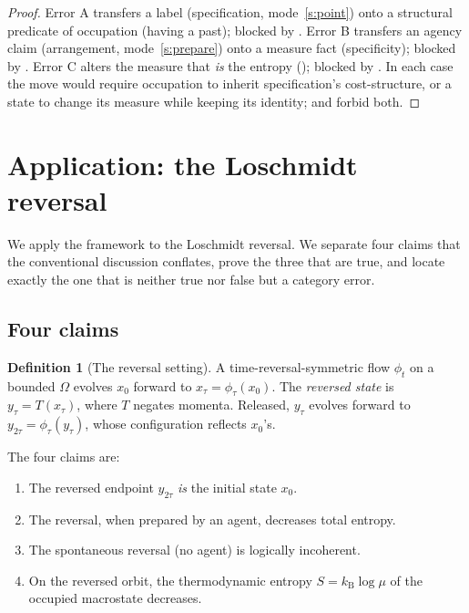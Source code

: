 \documentclass[11pt,a4paper]{article}
\theoremstyle{thmstyle}
\theoremstyle{definition}
\newtheorem{definition}[theorem]{Definition}
\theoremstyle{remark}
\newcommand{\Space}{\Omega}
\newcommand{\kB}{k_{\mathrm{B}}}
\begin{document}
\begin{proof}
Error A transfers a label (specification, mode~\ref{s:point}) onto a structural
predicate of occupation (having a past); blocked by . Error
B transfers an agency claim (arrangement, mode~\ref{s:prepare}) onto a measure
fact (specificity); blocked by . Error C alters the
measure that \emph{is} the entropy (); blocked by
. In each case the move would require occupation to inherit
specification's cost-structure, or a state to change its measure while keeping its
identity;  and  forbid both.
\end{proof}

\section{Application: the Loschmidt reversal}
\label{sec:loschmidt}

We apply the framework to the Loschmidt reversal. We separate four claims that
the conventional discussion conflates, prove the three that are true, and locate
exactly the one that is neither true nor false but a category error.

\subsection{Four claims}

\begin{definition}[The reversal setting]
\label{def:reversal}
A time-reversal-symmetric flow $\phi_t$ on a bounded $\Space$ evolves $x_0$
forward to $x_\tau=\phi_\tau(x_0)$. The \emph{reversed state} is
$y_\tau=T(x_\tau)$, where $T$ negates momenta. Released, $y_\tau$ evolves forward
to $y_{2\tau}=\phi_\tau(y_\tau)$, whose configuration reflects $x_0$'s.
\end{definition}

The four claims are:
\begin{enumerate}[label=\textup{(L\arabic*)},leftmargin=3em,nosep]
\item\label{l:identity} The reversed endpoint $y_{2\tau}$ \emph{is} the initial
state $x_0$.
\item\label{l:prepared} The reversal, when prepared by an agent, decreases total
entropy.
\item\label{l:incoherent} The spontaneous reversal (no agent) is logically
incoherent.
\item\label{l:value} On the reversed orbit, the thermodynamic entropy
$S=\kB\log\mu$ of the occupied macrostate decreases.
\end{enumerate}
\end{document}

